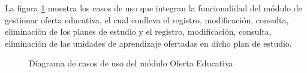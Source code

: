 La figura \ref{fig:casosUso:gestionarOfertaEducativa} muestra los casos de uso que integran la funcionalidad del módulo de gestionar oferta educativa, el cual conlleva el registro, modificación, consulta, eliminación de los planes de estudio y el registro, modificación, consulta, eliminación de las unidades de aprendizaje ofertadas en dicho plan de estudio.
\begin{figure}[htpb!]
	\begin{center}
		\caption{Diagrama de casos de uso del módulo Oferta Educativa \label{fig:casosUso:gestionarOfertaEducativa}}
	\end{center}
\end{figure}
